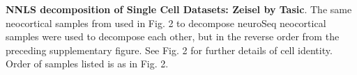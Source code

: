 \textbf{NNLS decomposition of Single Cell Datasets: Zeisel by Tasic}. The same neocortical samples from \citep{Tasic_2018,Zeisel_2018} used in Fig. 2 to decompose neuroSeq neocortical samples were used to decompose each other, but in the reverse order from the preceding supplementary figure. See Fig. 2 for further details of cell identity. Order of samples listed is as in Fig. 2. 
